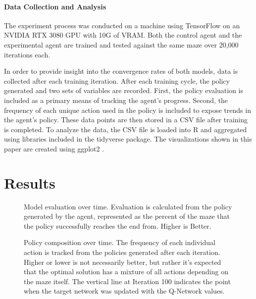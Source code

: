 \documentclass[12pt,letterpaper]{article}
\begin{document}
\paragraph{Data Collection and Analysis}
The experiment process was conducted on a machine using TensorFlow \cite{lib_tensorflow} on an NVIDIA RTX 3080 GPU with 10G of VRAM.
Both the control agent and the experimental agent are trained and tested against the same maze over 20,000 iterations each.

In order to provide insight into the convergence rates of both models, data is collected after each training iteration.
After each training cycle, the policy generated and two sets of variables are recorded.
First, the policy evaluation is included as a primary means of tracking the agent's progress.
Second, the frequency of each unique action used in the policy is included to expose trends in the agent's policy.
These data points are then stored in a CSV file after training is completed.
To analyze the data, the CSV file is loaded into R \cite{lang_r} and aggregated using libraries included in the tidyverse \cite{lib_tidyverse} package.
The visualizations shown in this paper are created using ggplot2 \cite{lib_ggplot2}.

\section{Results}

\begin{figure}[h]
	\begin{center}
		
	\end{center}
	\caption{Model evaluation over time. Evaluation is calculated from the policy generated by the agent, represented as the percent of the maze that the policy successfully reaches the end from. Higher is Better.}
	\label{fig:evaluation}
\end{figure}

\begin{figure}[h]
	\begin{center}
		
	\end{center}
	\caption{Policy composition over time. The frequency of each individual action is tracked from the policies generated after each iteration. Higher or lower is not necessarily better, but rather it's expected that the optimal solution has a mixture of all actions depending on the maze itself. The vertical line at Iteration 100 indicates the point when the target network was updated with the Q-Network values.}
	\label{fig:directional}
\end{figure}
\end{document}

